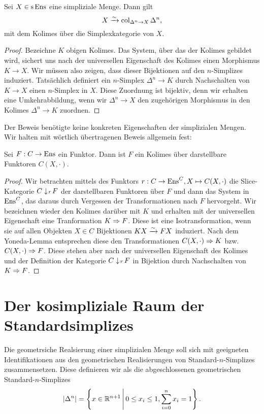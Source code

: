 \begin{lemma}
  Sei $X \in \operatorname{s}\operatorname{Ens}$ eine simpliziale Menge. Dann gilt
  \[ X \xrightarrow[]{\sim} \operatorname{col}_{\Delta^n \to X} \Delta^n, \]
  mit dem Kolimes über die Simplexkategorie von $X$.
\end{lemma}
\begin{proof}
  Bezeichne $K$ obigen Kolimes. Das System, über das der Kolimes
  gebildet wird, sichert uns nach der universellen Eigenschaft des
  Kolimes einen Morphismus $K \to X$. Wir müssen also zeigen, dass
  dieser Bijektionen auf den $n$-Simplizes induziert. Tatsächlich
  definiert ein $n$-Simplex $\Delta^n \to K$ durch Nachschalten von
  $K \to X$ einen $n$-Simplex in $X$. Diese Zuordnung ist bijektiv,
  denn wir erhalten eine Umkehrabbildung, wenn wir $\Delta^n \to X$
  den zugehörigen Morphismus in den Kolimes $\Delta^n \to K$ zuordnen.
\end{proof}
Der Beweis benötigte keine konkreten Eigenschaften der simplizialen
Mengen. Wir halten mit wörtlich übertragenen Beweis allgemein fest:
\begin{prop}
  Sei $F: C \to \operatorname{Ens}$ ein Funktor. Dann ist $F$ ein Kolimes über
  darstellbare Funktoren $C(X, \cdot)$.
\end{prop}
\begin{proof}
  Wir betrachten mittels des Funktors $r: C \to \operatorname{Ens}^C, X \mapsto
  C(X, \cdot)$ die Slice-Kategorie $C \downarrow \! {\scriptstyle r} \, F$ der
  darstellbaren Funktoren über $F$ und dann das System in $\operatorname{Ens}^C$,
  das daraus durch Vergessen der Transformationen nach $F$
  hervorgeht. Wir bezeichnen wieder den Kolimes darüber mit $K$ und
  erhalten mit der universellen Eigenschaft eine Tranformation
  $K \Rightarrow F$. Diese ist eine Isotransformation, wenn sie auf allen
  Objekten $X \in C$ Bijektionen $KX \xrightarrow[]{\sim} FX$ induziert. Nach dem
  Yoneda-Lemma entsprechen diese den Transformationen
  $C(X, \cdot) \Rightarrow K$ bzw. $C(X, \cdot) \Rightarrow F$. Diese stehen
  aber nach der universellen Eigenschaft des Kolimes und der
  Definition der Kategorie $C \downarrow \! {\scriptstyle r} \, F$ in Bijektion durch
  Nachschalten von $K \Rightarrow F$.
\end{proof}

\section{Der kosimpliziale Raum der Standardsimplizes}

Die geometrsiche Realsierung einer simplizialen Menge soll sich mit
geeigneten Identifikationen aus den geometrischen Realisierungen von
Standard-$n$-Simplizes zusammensetzen. Diese definieren wir als die
abgeschlossenen geometrischen Standard-$n$-Simplizes
\[ |\Delta^n| = \left\{ x \in \mathbb{R}^{n+1} \,\middle|\, 0 \leq x_i \leq 1, \sum_{i=0}^n x_i = 1 \right\}. \]

